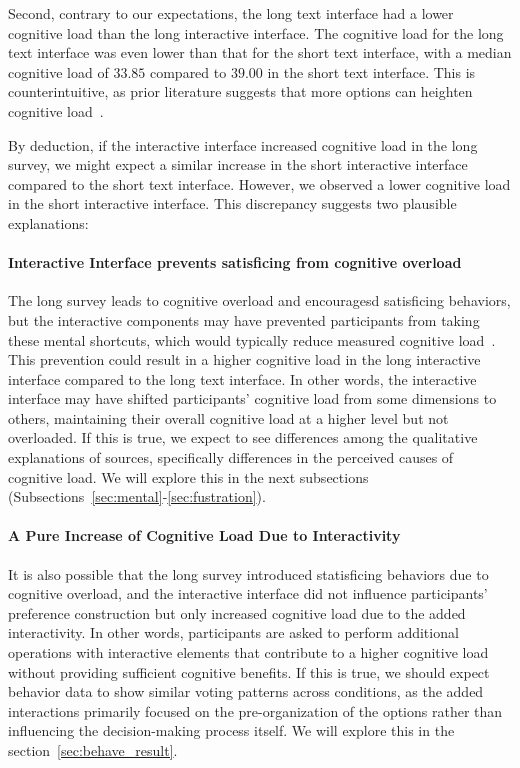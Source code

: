 Second, contrary to our expectations, the long text interface had a lower cognitive load than the long interactive interface. The cognitive load for the long text interface was even lower than that for the short text interface, with a median cognitive load of $33.85$ compared to $39.00$ in the short text interface. This is counterintuitive, as prior literature suggests that more options can heighten cognitive load~\cite{swellerCognitiveLoadTheory2011}.

By deduction, if the interactive interface increased cognitive load in the long survey, we might expect a similar increase in the short interactive interface compared to the short text interface. However, we observed a lower cognitive load in the short interactive interface. This discrepancy suggests two plausible explanations:

\paragraph{Interactive Interface prevents satisficing from cognitive overload} The long survey leads to cognitive overload and encouragesd satisficing behaviors, but the interactive components may have prevented participants from taking these mental shortcuts, which would typically reduce measured cognitive load~\cite{daniel2017thinking, simonBehavioralModelRational1955, payneAdaptiveStrategySelection1988, tverskyJudgmentsRepresentativeness}. This prevention could result in a higher cognitive load in the long interactive interface compared to the long text interface. In other words, the interactive interface may have shifted participants' cognitive load from some dimensions to others, maintaining their overall cognitive load at a higher level but not overloaded. If this is true, we expect to see differences among the qualitative explanations of sources, specifically differences in the perceived causes of cognitive load. We will explore this in the next subsections (Subsections~\ref{sec:mental}-\ref{sec:fustration}).

\paragraph{A Pure Increase of Cognitive Load Due to Interactivity} It is also possible that the long survey introduced statisficing behaviors due to cognitive overload, and the interactive interface did not influence participants' preference construction but only increased cognitive load due to the added interactivity. In other words, participants are asked to perform additional operations with interactive elements that contribute to a higher cognitive load without providing sufficient cognitive benefits. If this is true, we should expect behavior data to show similar voting patterns across conditions, as the added interactions primarily focused on the pre-organization of the options rather than influencing the decision-making process itself. We will explore this in the section~\ref{sec:behave_result}.

